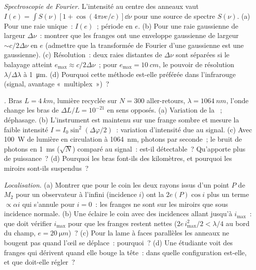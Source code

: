 \begin{exercise}[$\star\star\star$]\label{exo:b2:michelson:10}
\emph{Spectroscopie de Fourier.} L'intensité au centre des anneaux
vaut $I(e) = \int S(\nu)[1 + \cos(4\pi\nu e/c)]\dd\nu$ pour une source de spectre
$S(\nu)$. (a) Pour une raie unique~: $I(e)$~; période en $e$. (b) Pour une raie
gaussienne de largeur $\Delta\nu$~: montrer que les franges ont une enveloppe gaussienne de
largeur $\sim c/2\Delta\nu$ en $e$ (admettre que la transformée de Fourier d'une gaussienne
est une gaussienne). (c) Résolution~: deux raies distantes de $\Delta\nu$ sont séparées si
le balayage atteint $e_{\max} \approx c/2\Delta\nu$~; pour $e_{\max} = \qty{10}{cm}$, le
pouvoir de résolution $\lambda/\Delta\lambda$ à \qty{1}{\micro m}. (d) Pourquoi cette méthode est-elle
préférée dans l'infrarouge (signal, avantage «~multiplex~»)~?
\end{exercise}

\begin{exercise}[$\star\star\star$]\label{exo:b2:michelson:11}
\emph{.} Bras $L = \qty{4}{km}$, lumière recyclée
sur $N = 300$ aller-retours, $\lambda = \qty{1064}{nm}$, l'onde change les bras de
$\Delta L/L = 10^{-21}$ en sens opposés. (a) Variation de la ~;
déphasage. (b) L'instrument est maintenu sur une frange sombre et mesure la
faible intensité $I = I_0\sin^2(\Delta\varphi/2)$~: variation d'intensité due au
signal. (c) Avec \qty{100}{W} de lumière en circulation à \qty{1064}{nm}, photons
par seconde~; le bruit de photons en \qty{1}{ms} ($\sqrt N$) comparé au signal~:
est-il détectable~? Qu'apporte plus de puissance~? (d) Pourquoi les bras font-ils
des kilomètres, et pourquoi les miroirs sont-ils suspendus~?
\end{exercise}

\begin{exercise}[$\star\star\star$]\label{exo:b2:michelson:12}
\emph{Localisation.} (a) Montrer que pour le coin les deux rayons issus d'un
point $P$ de $M_2$ pour un observateur à l'infini (incidence $i$) ont la
 $2e(P)\cos i$ plus un terme $\propto\alpha i$ qui s'annule pour
$i = 0$~: les franges ne sont sur les miroirs que sous incidence normale. (b)
Une  éclaire le coin avec des incidences allant jusqu'à
$i_{\max}$~: que doit vérifier $i_{\max}$ pour que les franges restent nettes
($2e\,i_{\max}^2/2 < \lambda/4$ au bord du champ, $e = \qty{20}{\micro m}$)~? (c)
Pour la lame à faces parallèles les anneaux ne bougent pas quand l'œil se déplace~:
pourquoi~? (d) Une étudiante voit des franges qui dérivent quand elle bouge la tête~:
dans quelle configuration est-elle, et que doit-elle régler~?
\end{exercise}

